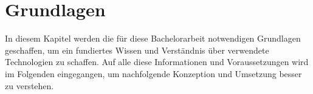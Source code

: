 
\chapter{Grundlagen}
\label{chap:Grundlagen}
In diesem Kapitel werden die für diese Bachelorarbeit notwendigen Grundlagen geschaffen, um ein fundiertes Wissen und Verständnis 
über verwendete Technologien zu schaffen. Auf alle diese Informationen und Voraussetzungen wird im Folgenden eingegangen, um nachfolgende 
Konzeption und Umsetzung besser zu verstehen.

